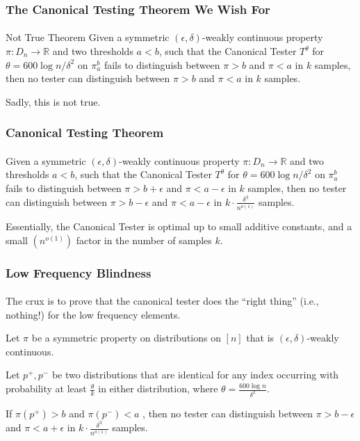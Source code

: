 \documentclass{beamer}
\begin{document}
\begin{frame}
  \frametitle{The Canonical Testing Theorem We Wish For}
  \framesubtitle{}
  \begin{block}{Not True Theorem}
    Given a symmetric $(\epsilon,\delta)$-weakly continuous property
    $\pi:D_n\rightarrow \mathbb{R}$ and two thresholds $a<b$, such
    that the Canonical Tester $T^\theta$ for $\theta=600\log
    n/\delta^2$ on $\pi_a^b$ fails to distinguish between $\pi>b$ and
    $\pi<a$ in $k$ samples, then no tester can distinguish between
    $\pi>b$ and $\pi<a$ in $k$ samples.
  \end{block}
  Sadly, this is not true.
\end{frame}
\begin{frame}
  \frametitle{Canonical Testing Theorem}
  \framesubtitle{}
  \begin{theorem}
    Given a symmetric $(\epsilon,\delta)$-weakly continuous property
    $\pi:D_n\rightarrow \mathbb{R}$ and two thresholds $a<b$, such
    that the Canonical Tester $T^\theta$ for $\theta=600\log
    n/\delta^2$ on $\pi_a^b$ fails to distinguish between
    $\pi>b+\epsilon$ and $\pi<a-\epsilon$ in $k$ samples, then no
    tester can distinguish between $\pi>b-\epsilon$ and
    $\pi<a-\epsilon$ in $k\cdot \frac{\delta^3}{n^{o(1)}}$ samples.
  \end{theorem}
  Essentially, the Canonical Tester is optimal up to small additive
  constants, and a small $(n^{o(1)})$ factor in the number of samples
  $k$.
\end{frame}


\begin{frame}
  \frametitle{Low Frequency Blindness} \framesubtitle{}
  The crux is to prove that the canonical tester does the ``right
  thing'' (i.e., nothing!) for the low frequency elements.
  
  \begin{theorem}
    Let $\pi$ be a symmetric property on distributions on $[n]$ that
    is $(\epsilon,\delta)$-weakly continuous.

    Let $p^+,p^-$ be two distributions that are identical for any
    index occurring with probability at least $\frac{\theta}{k}$ in
    either distribution, where $\theta=\frac{600\log n}{\delta^2}$.

    If $\pi(p^+)>b$ and $\pi(p^-)<a$ , then no tester can distinguish
    between $\pi>b-\epsilon$ and $\pi<a+\epsilon$ in $k\cdot
    \frac{\delta^3}{n^{o(1)}}$ samples.
  \end{theorem}


\end{frame}
\end{document}

